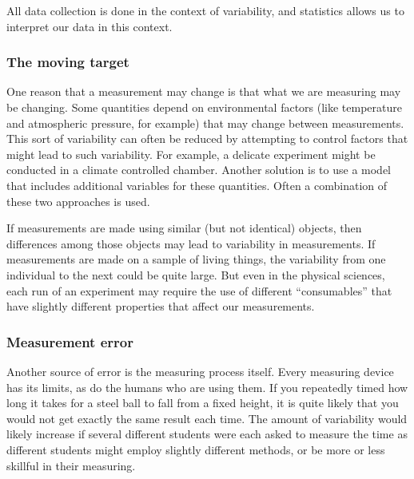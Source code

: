 \documentclass[twoside]{book}\usepackage[]{graphicx}\usepackage[]{xcolor}
\newcounter{example}[section]
\begin{document}
All data collection is done in the context of variability,
and statistics allows us to interpret our data in this context.


\subsubsection{The moving target}
One reason that a measurement may change is that what we are measuring
may be changing.  Some quantities depend on environmental factors (like 
temperature and atmospheric pressure, for example) that may change
between measurements.   This sort of variability can often be reduced
by attempting to  control factors that might lead to such variability.
For example, a delicate experiment might be conducted in a
climate controlled chamber.
Another solution is to use a model that includes additional variables 
for these quantities.  Often a combination of these two approaches is used.

If measurements are made using similar (but not identical) objects, then
differences among those objects may lead to variability in measurements.   If
measurements are made on a sample of living things, the variability from one
individual to the next could be quite large.  But even in the physical
sciences, each run of an experiment may require the use of different
``consumables'' that have slightly different properties that affect 
our measurements.

\subsubsection{Measurement error}

Another source of error is the measuring process itself.  Every
measuring device has its limits, as do the humans who are using them.
If you repeatedly timed how long it takes for a steel ball to fall from a fixed 
height, it is quite likely 
that you would not get exactly the same result each time.  The amount of 
variability would likely increase if several different students were 
each asked to measure the time as different students
might employ slightly different methods, or be more or less skillful in 
their measuring.
\end{document}
